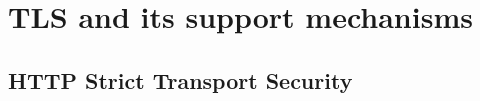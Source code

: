 \section{TLS and its support mechanisms}
\label{section:TLS}

\subsection{HTTP Strict Transport Security}
\label{subsection:HSTS}




